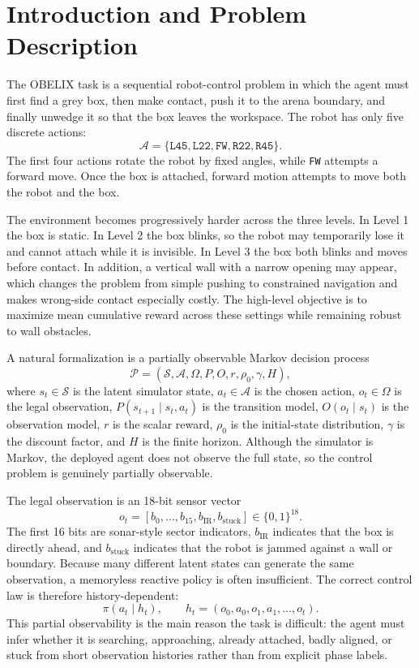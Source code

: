 \documentclass[11pt, oneside]{article}   	%
\begin{document}
\section{Introduction and Problem Description}

The OBELIX task is a sequential robot-control problem in which the agent must first find a grey box, then make contact, push it to the arena boundary, and finally unwedge it so that the box leaves the workspace. The robot has only five discrete actions:
\[
\mathcal{A}=\{\texttt{L45},\texttt{L22},\texttt{FW},\texttt{R22},\texttt{R45}\}.
\]
The first four actions rotate the robot by fixed angles, while \texttt{FW} attempts a forward move. Once the box is attached, forward motion attempts to move both the robot and the box.

The environment becomes progressively harder across the three levels. In Level 1 the box is static. In Level 2 the box blinks, so the robot may temporarily lose it and cannot attach while it is invisible. In Level 3 the box both blinks and moves before contact. In addition, a vertical wall with a narrow opening may appear, which changes the problem from simple pushing to constrained navigation and makes wrong-side contact especially costly. The high-level objective is to maximize mean cumulative reward across these settings while remaining robust to wall obstacles.

A natural formalization is a partially observable Markov decision process
\[
\mathcal{P}=(\mathcal{S},\mathcal{A},\Omega,P,O,r,\rho_0,\gamma,H),
\]
where \(s_t\in\mathcal{S}\) is the latent simulator state, \(a_t\in\mathcal{A}\) is the chosen action, \(o_t\in\Omega\) is the legal observation, \(P(s_{t+1}\mid s_t,a_t)\) is the transition model, \(O(o_t\mid s_t)\) is the observation model, \(r\) is the scalar reward, \(\rho_0\) is the initial-state distribution, \(\gamma\) is the discount factor, and \(H\) is the finite horizon. Although the simulator is Markov, the deployed agent does not observe the full state, so the control problem is genuinely partially observable.

The legal observation is an 18-bit sensor vector
\[
o_t=[b_0,\ldots,b_{15},b_{\mathrm{IR}},b_{\mathrm{stuck}}]\in\{0,1\}^{18}.
\]
The first 16 bits are sonar-style sector indicators, \(b_{\mathrm{IR}}\) indicates that the box is directly ahead, and \(b_{\mathrm{stuck}}\) indicates that the robot is jammed against a wall or boundary. Because many different latent states can generate the same observation, a memoryless reactive policy is often insufficient. The correct control law is therefore history-dependent:
\[
\pi(a_t\mid h_t), \qquad h_t=(o_0,a_0,o_1,a_1,\ldots,o_t).
\]
This partial observability is the main reason the task is difficult: the agent must infer whether it is searching, approaching, already attached, badly aligned, or stuck from short observation histories rather than from explicit phase labels.
\end{document}
